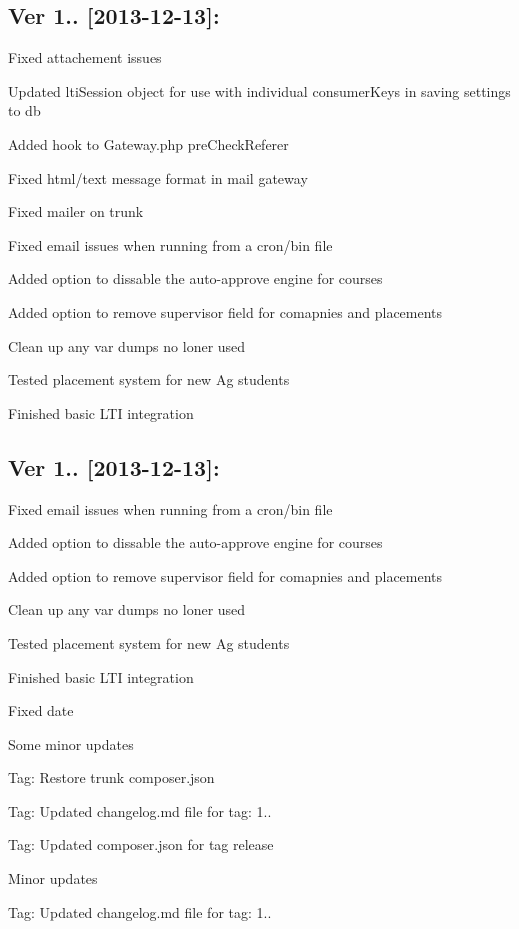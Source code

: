 \subsection*{Ver 1.. \mbox{[}2013-\/12-\/13\mbox{]}\+: }


\begin{DoxyItemize}
\item Fixed attachement issues
\item Updated lti\+Session object for use with individual consumer\+Keys in saving settings to db
\item Added hook to Gateway.\+php pre\+Check\+Referer
\item Fixed html/text message format in mail gateway
\item Fixed mailer on trunk
\item Fixed email issues when running from a cron/bin file
\item Added option to dissable the auto-\/approve engine for courses
\item Added option to remove supervisor field for comapnies and placements
\item Clean up any var dumps no loner used
\item Tested placement system for new Ag students
\item Finished basic L\+T\+I integration
\end{DoxyItemize}

\subsection*{Ver 1.. \mbox{[}2013-\/12-\/13\mbox{]}\+: }


\begin{DoxyItemize}
\item Fixed email issues when running from a cron/bin file
\item Added option to dissable the auto-\/approve engine for courses
\item Added option to remove supervisor field for comapnies and placements
\item Clean up any var dumps no loner used
\item Tested placement system for new Ag students
\item Finished basic L\+T\+I integration
\item Fixed date
\item Some minor updates
\item Tag\+: Restore trunk composer.\+json
\item Tag\+: Updated changelog.\+md file for tag\+: 1..
\item Tag\+: Updated composer.\+json for tag release
\item Minor updates
\item Tag\+: Updated changelog.\+md file for tag\+: 1..
\end{DoxyItemize}

